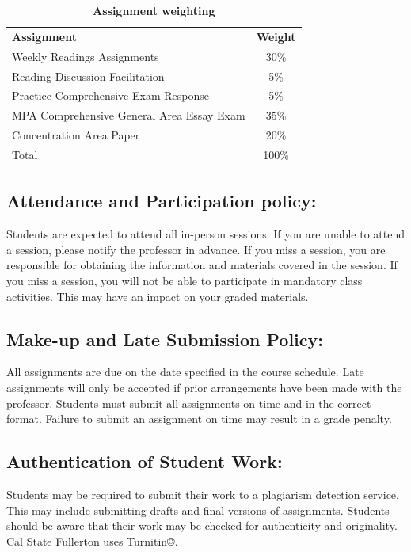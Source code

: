 \documentclass[12pt]{article}     %
\begin{document}
\begin{center}
\begin{table}[h]
  \caption{\textbf{Assignment weighting}}
  \label{tab:grade-weights}
  \centering
  \begin{tabular}{l c}
    \rowcolor{gray!20}
    \textbf{Assignment} & \textbf{Weight} \\
    Weekly Readings Assignments & 30\% \\
    Reading Discussion Facilitation & 5\% \\
    Practice Comprehensive Exam Response & 5\% \\
    MPA Comprehensive General Area Essay Exam & 35\% \\
    Concentration Area Paper & 20\% \\
  Total            & 100\%      \\
  \end{tabular}
\end{table}
\end{center}


	\subsection*{Attendance and Participation policy:}
Students are expected to attend all in-person sessions. If you are unable to attend a session, please notify the professor in advance. If you miss a session, you are responsible for obtaining the information and materials covered in the session. If you miss a session, you will not be able to participate in mandatory class activities. This may have an impact on your graded materials. 

	\subsection*{Make-up and Late Submission Policy:}
		All assignments are due on the date specified in the course schedule. Late assignments will only be accepted if prior arrangements have been made with the professor. Students must submit all assignments on time and in the correct format. Failure to submit an assignment on time may result in a grade penalty.

	\subsection*{Authentication of Student Work:}
        Students may be required to submit their work to a plagiarism detection service. This may include submitting drafts and final versions of assignments. Students should be aware that their work may be checked for authenticity and originality. Cal State Fullerton uses Turnitin\copyright.
\end{document}
